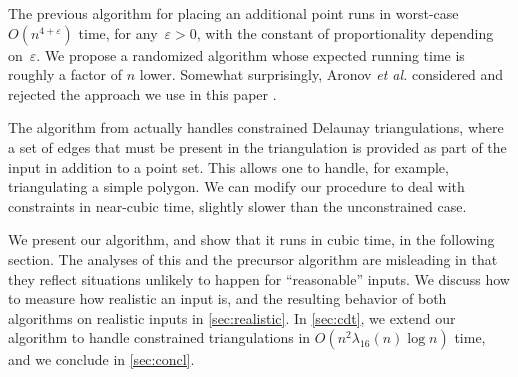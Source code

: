 \documentclass{cccg13}
\let\eps\varepsilon
\begin{document}
The previous algorithm \cite{orig} for placing an additional point runs in worst-case $O(n^{4+\eps})$ time, for any~$\eps>0$, with the constant of proportionality depending on~$\eps$.  We propose a randomized algorithm whose expected running time is roughly a factor of $n$ lower.  Somewhat surprisingly, Aronov \emph{et al.} considered and rejected the approach we use in this paper \cite[page~96]{orig}.

The algorithm from \cite{orig} actually handles constrained Delaunay
triangulations, where a set of edges that must be present in the
triangulation is provided as part of the input in addition to a point
set.  This allows one to handle, for example, triangulating a simple
polygon.  We can modify our procedure to deal with constraints in
near-cubic time, slightly slower than the unconstrained case.

We present our algorithm, and show that it runs in cubic time, in the following section.  The analyses of this and the precursor algorithm \cite{orig} are misleading in that they reflect situations unlikely to happen for ``reasonable'' inputs.  We discuss how to measure how realistic an input is, and the resulting behavior of both algorithms on realistic inputs in \autoref{sec:realistic}.  In \autoref{sec:cdt}, we extend our algorithm to handle constrained triangulations in $O(n^2\lambda_{16}(n)\log n)$ time, and we conclude in \autoref{sec:concl}.
\end{document}
